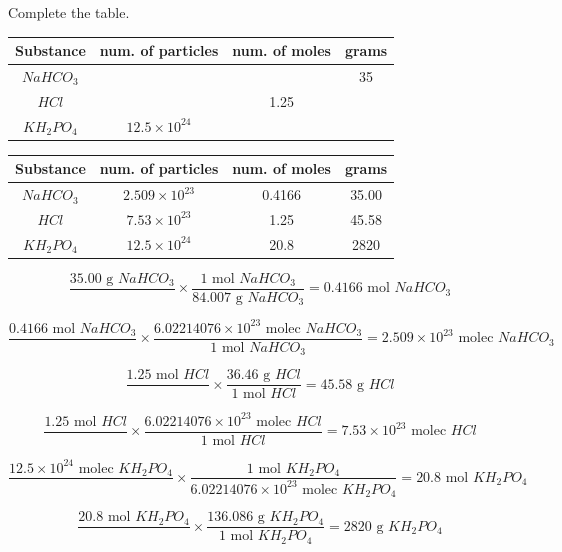 \begin{Exercise}[title = {Grams, Moles, Molecules, and Atoms}, label = convert]
Complete the table.

\begin{tabular}{|c|c|c|c|}
\hline
Substance & num. of particles & num. of moles & grams\\\hline
$NaHCO_3$ & & & 35\\\hline
$HCl$ & & 1.25 & \\\hline
$KH_2PO_4$ & $12.5 \times 10^{24}$ & & \\\hline
\end{tabular}
\vspace{75mm}
\end{Exercise}

\begin{Answer}[ref = convert]
\begin{tabular}{|c|c|c|c|}
\hline
Substance & num. of particles & num. of moles & grams \\\hline
$NaHCO_3$ & $2.509 \times 10^{23}$ & 0.4166 & 35.00 \\\hline
$HCl$ & $7.53 \times 10^{23}$ & 1.25 & 45.58 \\\hline
$KH_2PO_4$ & $12.5 \times 10^{24}$ & 20.8 & 2820 \\\hline
\end{tabular}

$$\frac{35.00\text{ g }NaHCO_3}{} \times 
\frac{1\text{ mol } NaHCO_3}{84.007\text{ g }NaHCO_3} = 0.4166\text{ mol }NaHCO_3$$

$$\frac{0.4166\text{ mol }NaHCO_3}{} \times \frac{6.02214076 
\times 10^{23}\text{ molec }NaHCO_3}{1\text{ mol }NaHCO_3} = 
2.509 \times 10^{23}\text{ molec }NaHCO_3$$

$$\frac{1.25\text{ mol }HCl}{} \times 
\frac{36.46\text{ g }HCl}{1\text{ mol }HCl} = 45.58\text{ g }HCl$$

$$\frac{1.25\text{ mol }HCl}{} \times 
\frac{6.02214076 \times 10^{23}\text{ molec }HCl}{1\text{ mol }HCl} 
= 7.53 \times 10^{23}\text{ molec }HCl$$

$$\frac{12.5 \times 10^{24}\text{ molec }KH_2PO_4}{} \times 
\frac{1\text{ mol }KH_2PO_4}{6.02214076 \times 10^{23}\text{ molec }KH_2PO_4} 
= 20.8\text{ mol }KH_2PO_4$$

$$\frac{20.8\text{ mol }KH_2PO_4}{} \times 
\frac{136.086\text{ g }KH_2PO_4}{1\text{ mol }KH_2PO_4} = 
2820\text{ g }KH_2PO_4$$
\end{Answer}


